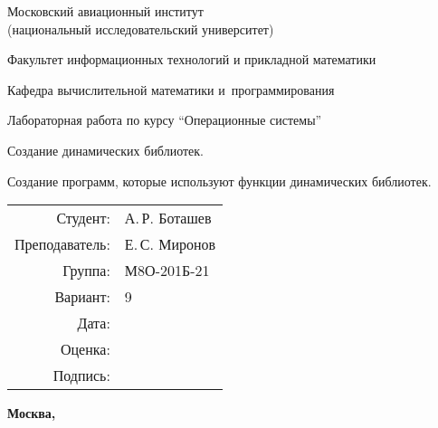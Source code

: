 \documentclass[pdf, unicode, 12pt, a4paper,oneside,fleqn]{article}
\begin{document}
\begin{titlepage}
    \begin{center}
        \bfseries

        {\Large Московский авиационный институт\\ (национальный исследовательский университет)}
        
        \vspace{48pt}
        
        {\large Факультет информационных технологий и прикладной математики}
        
        \vspace{36pt}
        
        {\large Кафедра вычислительной математики и~программирования}
        
        \vspace{48pt}
        
        Лабораторная работа  по курсу \enquote{Операционные системы}

        \vspace{48pt}

        Создание динамических библиотек. 
        
        Создание программ, которые используют функции динамических библиотек.
    \end{center}
    
    \vspace{125pt}
    
    \begin{flushright}
    \begin{tabular}{rl}
    Студент: & А.\,Р. Боташев \\
    Преподаватель: & Е.\,С. Миронов \\
    Группа: & М8О-201Б-21 \\
    Вариант: & 9 \\
    Дата: & \\
    Оценка: & \\
    Подпись: & \\
    \end{tabular}
    \end{flushright}
    
    \vfill
    
    \begin{center}
    \bfseries
    Москва, \the\year
    \end{center}
\end{titlepage}
    
\pagebreak
\end{document}
